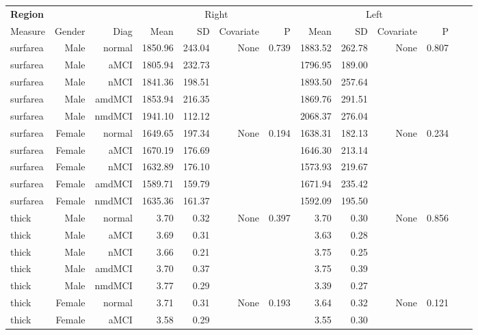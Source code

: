\documentclass[12pt]{article}\usepackage[]{graphicx}\usepackage[]{color}
\newcommand\T{\rule{0pt}{2.6ex}}
\newcommand\B{\rule[-1.2ex]{0pt}{0pt}}
\begin{document}
  \newpage
\begin{sidewaystable}
  \centering
  \footnotesize
  \begin{tabular}{l|rr|rrrr|rrrr|rr}
	\hline
	\textbf{Region} & & & \multicolumn{4}{c}{Right} \T & \multicolumn{4}{|c}{Left} & & \\
	\multicolumn{1}{l|}{Measure} \T\B & Gender & Diag & Mean & SD & Covariate & P & Mean & SD & Covariate & P \\
	\hline\hline
 surfarea & Male & normal & 1850.96 & 243.04 & None & 0.739 & 1883.52 & 262.78 & None & 0.807 \\ 
  surfarea & Male & aMCI & 1805.94 & 232.73 &  &  & 1796.95 & 189.00 &  &  \\ 
  surfarea & Male & nMCI & 1841.36 & 198.51 &  &  & 1893.50 & 257.64 &  &  \\ 
  surfarea & Male & amdMCI & 1853.94 & 216.35 &  &  & 1869.76 & 291.51 &  &  \\ 
  surfarea & Male & nmdMCI & 1941.10 & 112.12 &  &  & 2068.37 & 276.04 &  &  \\ 
   \hline
surfarea & Female & normal & 1649.65 & 197.34 & None & 0.194 & 1638.31 & 182.13 & None & 0.234 \\ 
  surfarea & Female & aMCI & 1670.19 & 176.69 &  &  & 1646.30 & 213.14 &  &  \\ 
  surfarea & Female & nMCI & 1632.89 & 176.10 &  &  & 1573.93 & 219.67 &  &  \\ 
  surfarea & Female & amdMCI & 1589.71 & 159.79 &  &  & 1671.94 & 235.42 &  &  \\ 
  surfarea & Female & nmdMCI & 1635.36 & 161.37 &  &  & 1592.09 & 195.50 &  &  \\ 
   \hline
thick & Male & normal & 3.70 & 0.32 & None & 0.397 & 3.70 & 0.30 & None & 0.856 \\ 
  thick & Male & aMCI & 3.69 & 0.31 &  &  & 3.63 & 0.28 &  &  \\ 
  thick & Male & nMCI & 3.66 & 0.21 &  &  & 3.75 & 0.25 &  &  \\ 
  thick & Male & amdMCI & 3.70 & 0.37 &  &  & 3.75 & 0.39 &  &  \\ 
  thick & Male & nmdMCI & 3.77 & 0.29 &  &  & 3.39 & 0.27 &  &  \\ 
   \hline
thick & Female & normal & 3.71 & 0.31 & None & 0.193 & 3.64 & 0.32 & None & 0.121 \\ 
  thick & Female & aMCI & 3.58 & 0.29 &  &  & 3.55 & 0.30 &  &  \\ 

\end{tabular}
\end{sidewaystable}
\end{document}
